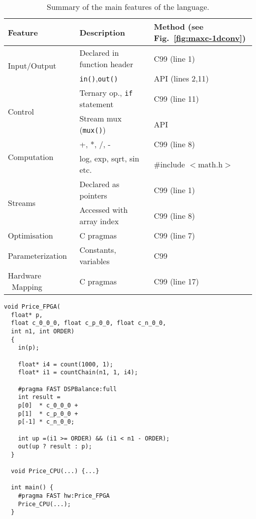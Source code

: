 \begin{table}[!h]
  \centering
  \renewcommand{\arraystretch}{1.5}
  \caption{Summary of the main features of the \FAST{} language.}
  \label{table:maxc-features}
  \begin{tabularx}{\textwidth}{X|X|X}
    \hline
    \bf{Feature}                   & \bf{Description}                   & \bf{Method (see Fig.~\ref{fig:maxc-1dconv})} \\
    \hline\hline
    \multirow{2}{*}{Input/Output}         & Declared in function header          & C99 (line 1)                                 \\\cline{2-3}       & \texttt{in()},\texttt{out()}  & \FAST{} API (lines 2,11) \\
    \hline
    \multirow{2}{*}{Control}     & Ternary op., \texttt{if} statement & C99 (line 11)                                \\\cline{2-3}      & Stream mux (\texttt{mux()})       & \FAST{} API  \\
    \hline
    \multirow{2}{*}{Computation} & +, *, /, -                         & C99 (line 8)                           \\\cline{2-3} & log, exp, sqrt, sin etc.  & \#include $<$math.h$>$  \\
    \hline
    \multirow{2}{*}{Streams}     & Declared as pointers               & C99 (line 1)                                 \\\cline{2-3}       & Accessed with array index & C99 (line 8) \\
    \hline
    Optimisation                 & C pragmas                   & C99 (line 7)                                 \\
    \hline
    Parameterization             & Constants, variables                   & C99                                          \\
    \hline
    Hardware \  Mapping                  & C pragmas                   & C99 (line 17)                                \\
  \end{tabularx}
\end{table}


\lstset{style=MaxC}

\begin{lstlisting}[caption={\FAST{} dataflow kernel for European Options pricing}]
  void Price_FPGA(
  float* p,
  float c_0_0_0, float c_p_0_0, float c_n_0_0,
  int n1, int ORDER)
  {
    in(p);

    float* i4 = count(1000, 1);
    float* i1 = countChain(n1, 1, i4);

    #pragma FAST DSPBalance:full
    int result =
    p[0]  * c_0_0_0 +
    p[1]  * c_p_0_0 +
    p[-1] * c_n_0_0;

    int up =(i1 >= ORDER) && (i1 < n1 - ORDER);
    out(up ? result : p);
  }

  void Price_CPU(...) {...}

  int main() {
    #pragma FAST hw:Price_FPGA
    Price_CPU(...);
  }
\end{lstlisting}


